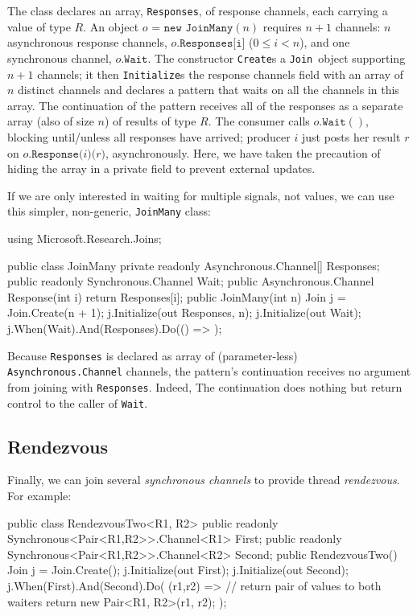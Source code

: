 \documentclass{article}
\newcommand{\cjoin}{{\texttt{Join}}}
\newcommand{\Initialize}{\texttt{Initialize}}
\newcommand{\tvarr}{\ensuremath{R}}
\begin{document}
The class declares an array, \texttt{Responses}, of response channels, each carrying a value of type \tvarr.
An object $o\texttt{ = new JoinMany}(n)$ requires $n+1$ channels: $n$ asynchronous response channels, $o\texttt{.Responses[i]}$ ($ 0\leq i < n$), and one synchronous channel, $o\texttt{.Wait}$.
The constructor \texttt{Create}s a \cjoin\ object supporting $n+1$ channels; 
it then {\Initialize}s the response channels field with an array of $n$ distinct channels and declares a pattern 
that waits on all the channels in this array. 
The continuation of the pattern receives all of the responses as a separate array (also of size $n$) of results of type $\tvarr$.
The consumer calls $o\texttt{.Wait}()$, blocking until/unless all responses have arrived; 
producer $i$ just posts her result $r$ on $o\texttt{.Response(}i\texttt{)(}r{)}$, asynchronously.
Here, we have taken the precaution of hiding the array in a private field to prevent external updates.

If we are only interested in waiting for multiple signals, not values, we can use this simpler, non-generic, \texttt{JoinMany} class:

\begin{lstcsharp}
using Microsoft.Research.Joins;

public class JoinMany {
  private readonly Asynchronous.Channel[] Responses;
  public readonly Synchronous.Channel Wait;
  public Asynchronous.Channel Response(int i) {
    return Responses[i];
  }
  public JoinMany(int n) {
    Join j = Join.Create(n + 1);
    j.Initialize(out Responses, n);
    j.Initialize(out Wait);
    j.When(Wait).And(Responses).Do(() => { });
  }
}
\end{lstcsharp}

Because \texttt{Responses} is declared as array of (parameter-less) \texttt{Asynchronous.Channel} channels, the pattern's continuation 
receives no argument from joining with \texttt{Responses}. Indeed,
The continuation does nothing but return control to the caller of \texttt{Wait}.


\subsection{Rendezvous}\label{sec:dynamicjoins}

Finally, we can join several \emph{synchronous channels} to provide thread \emph{rendezvous}. For example:

\begin{lstcsharp}
public class RendezvousTwo<R1, R2> {
  public readonly Synchronous<Pair<R1,R2>>.Channel<R1> First; 
  public readonly Synchronous<Pair<R1,R2>>.Channel<R2> Second;
  public RendezvousTwo(){
    Join j = Join.Create();
    j.Initialize(out First);
    j.Initialize(out Second);
    j.When(First).And(Second).Do(
      (r1,r2) => // return pair of values to both waiters
      { 
        return new Pair<R1, R2>(r1, r2); 
      });
 }
}
\end{lstcsharp}
\end{document}
